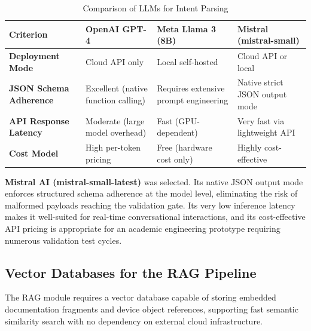 \begin{table}[htbp]
    \small
    \centering
    \renewcommand{\arraystretch}{1.4}
    \begin{tabular}{|p{3.0cm}|p{3.5cm}|p{3.5cm}|p{3.8cm}|}
        \hline
        \textbf{Criterion} & \textbf{OpenAI GPT-4} & \textbf{Meta Llama 3 (8B)} & \textbf{Mistral (mistral-small)} \\
        \hline
        \textbf{Deployment Mode} & Cloud API only & Local self-hosted & Cloud API or local \\
        \hline
        \textbf{JSON Schema Adherence} & Excellent (native function calling) & Requires extensive prompt engineering & Native strict JSON output mode \\
        \hline
        \textbf{API Response Latency} & Moderate (large model overhead) & Fast (GPU-dependent) & Very fast via lightweight API \\
        \hline
        \textbf{Cost Model} & High per-token pricing & Free (hardware cost only) & Highly cost-effective \\
        \hline
    \end{tabular}
    \caption{Comparison of LLMs for Intent Parsing}
    \label{tab:llm_comparison}
\end{table}

\textbf{Mistral AI (mistral-small-latest)} was selected. Its native JSON output mode enforces structured schema adherence at the model level, eliminating the risk of malformed payloads reaching the validation gate. Its very low inference latency makes it well-suited for real-time conversational interactions, and its cost-effective API pricing is appropriate for an academic engineering prototype requiring numerous validation test cycles.

\subsection{Vector Databases for the RAG Pipeline}
The RAG module requires a vector database capable of storing embedded documentation fragments and device object references, supporting fast semantic similarity search with no dependency on external cloud infrastructure.

